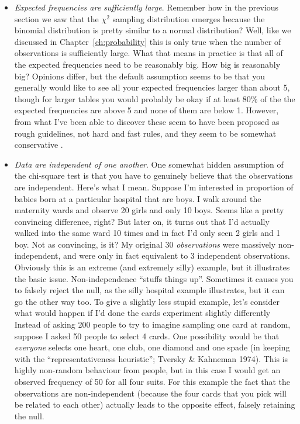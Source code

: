 \begin{itemize}
\item {\it Expected frequencies are sufficiently large}. Remember how in the previous section we saw that the $\chi^2$ sampling distribution emerges because the binomial distribution is pretty similar to a normal distribution? Well, like we discussed in Chapter~\ref{ch:probability} this is only true when the number of observations is sufficiently large. What that means in practice is that all of the expected frequencies need to be reasonably big. How big is reasonably big? Opinions differ, but the default assumption seems to be that you generally would like to see all your expected frequencies larger than about 5, though for larger tables you would probably be okay if at least 80\% of the the expected frequencies are above 5 and none of them are below 1. However, from what I've been able to discover \parencite[e.g.,][]{Cochran1954} these seem to have been proposed as rough guidelines, not hard and fast rules, and they seem to be somewhat conservative \parencite{Larntz1978}. 
\item {\it Data are independent of one another}. One somewhat hidden assumption of the chi-square test is that you have to genuinely believe that the observations are independent. Here's what I mean. Suppose I'm interested in proportion of babies born at a particular hospital that are boys. I walk around the maternity wards and observe 20 girls and only 10 boys. Seems like a pretty convincing difference, right? But later on, it turns out that I'd actually walked into the same ward 10 times and in fact I'd only seen 2 girls and 1 boy. Not as convincing, is it? My original 30 {\it observations} were massively non-independent, and were only in fact equivalent to 3 independent observations. Obviously this is an extreme (and extremely silly) example, but it illustrates the basic issue. Non-independence ``stuffs things up''. Sometimes it causes you to falsely reject the null, as the silly hospital example illustrates, but it can go the other way too. To give a slightly less stupid example, let's consider what would happen if I'd done the cards experiment slightly differently Instead of asking 200 people to try to imagine sampling one card at random, suppose I asked 50 people to select 4 cards. One possibility would be that {\it everyone} selects one heart, one club, one diamond and one spade (in keeping with the ``representativeness heuristic''; Tversky \& Kahneman 1974). This is highly non-random behaviour from people, but in this case I would get an observed frequency of 50 for all four suits. For this example the fact that the observations are non-independent (because the four cards that you pick will be related to each other) actually leads to the opposite effect, falsely retaining the null.
\end{itemize}

